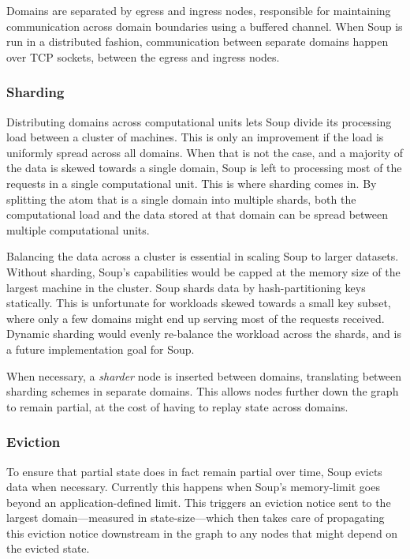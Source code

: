 Domains are separated by egress and ingress nodes, responsible for maintaining
communication across domain boundaries using a buffered channel. When Soup is
run in a distributed fashion, communication between separate domains happen
over TCP sockets, between the egress and ingress nodes.

\subsubsection{Sharding}

Distributing domains across computational units lets Soup divide its processing
load between a cluster of machines. This is only an improvement if the load is
uniformly spread across all domains. When that is not the case, and a majority
of the data is skewed towards a single domain, Soup is left to processing most
of the requests in a single computational unit. This is where sharding comes in.
By splitting the atom that is a single domain into multiple shards, both the
computational load and the data stored at that domain can be spread between
multiple computational units.

Balancing the data across a cluster is essential in scaling Soup to larger
datasets. Without sharding, Soup's capabilities would be capped at the memory
size of the largest machine in the cluster. Soup shards data by
hash-partitioning keys statically. This is unfortunate for workloads skewed
towards a small key subset, where only a few domains might end up serving most
of the requests received. Dynamic sharding would evenly re-balance the workload
across the shards, and is a future implementation goal for Soup.

When necessary, a \textit{sharder} node is inserted between domains, translating
between sharding schemes in separate domains. This allows nodes further down the
graph to remain partial, at the cost of having to replay state across domains.


\subsubsection{Eviction}\label{sec:eviction}

To ensure that partial state does in fact remain partial over time, Soup evicts
data when necessary. Currently this happens when Soup's memory-limit goes beyond
an application-defined limit. This triggers an eviction notice sent to the
largest domain---measured in state-size---which then takes care of propagating
this eviction notice downstream in the graph to any nodes that might depend on
the evicted state.

